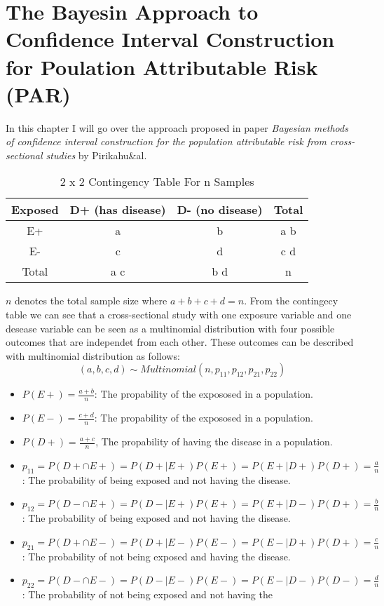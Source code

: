 \chapter{The Bayesin Approach to Confidence Interval Construction for Poulation Attributable Risk (PAR)} \label{bayesian-model}
In this chapter I will go over the approach proposed in paper \textit{Bayesian methods of confidence interval construction for the population attributable risk from cross-sectional studies} by Pirikahu\&al. 
\begin{table}[h!]
\centering
\caption{2 x 2 Contingency Table For n Samples}
\label{contingency-table}
\begin{tabular}{|c|c|c|c|}
\hline
Exposed & D+ (has disease) & D- (no disease) & Total \\ \hline
E+ & a & b & a \+ b \\ \hline
E- & c & d & c \+ d \\ \hline
Total & a \+ c & b \+ d & n \\ \hline
\end{tabular}
\end{table}

$n$ denotes the total sample size where $a + b + c + d = n$. From the contingecy table we can see that a cross-sectional study with one exposure variable and one desease variable can be seen as a multinomial distribution with four possible outcomes that are independet from each other. These outcomes can be described with multinomial distribution as follows:
\begin{equation}
(a, b, c, d) \sim Multinomial(n, p_{11}, p_{12}, p_{21}, p_{22})
\end{equation}

\begin{itemize}
    \item $P(E+) = \frac{a + b}{n}$: The propability of the expososed in a population.
    \item $P(E-) = \frac{c + d}{n}$: The propability of the expososed in a population.
    \item $P(D+) = \frac{a + c}{n}$, The propability of having the disease in a population.
    \item $p_{11} = P(D + \cap E+) = P(D + | E+)P(E+) = P(E + | D+)P(D+) = \frac{a}{n}$: The probability of being exposed and not having the disease.
    \item $p_{12} = P(D - \cap E+) = P(D - | E+)P(E+) = P(E + | D-)P(D+) = \frac{b}{n}$: The probability of being exposed and not having the disease.
    \item $p_{21} = P(D + \cap E-) = P(D + | E-)P(E-) = P(E - | D+)P(D+) = \frac{c}{n}$: The probability of not being exposed and having the disease.
    \item $p_{22} = P(D - \cap E-) = P(D - | E-)P(E-) = P(E - | D-)P(D-) = \frac{d}{n}$: The probability of not being exposed and not having the
\end{itemize}

